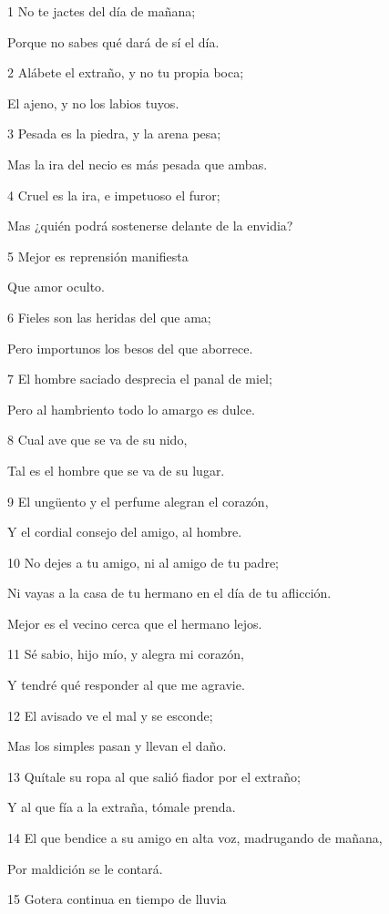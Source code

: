 \par 1 No te jactes del día de mañana;
\par Porque no sabes qué dará de sí el día. 
\par 2 Alábete el extraño, y no tu propia boca;
\par El ajeno, y no los labios tuyos.
\par 3 Pesada es la piedra, y la arena pesa;
\par Mas la ira del necio es más pesada que ambas.
\par 4 Cruel es la ira, e impetuoso el furor;
\par Mas ¿quién podrá sostenerse delante de la envidia?
\par 5 Mejor es reprensión manifiesta
\par Que amor oculto.
\par 6 Fieles son las heridas del que ama;
\par Pero importunos los besos del que aborrece.
\par 7 El hombre saciado desprecia el panal de miel;
\par Pero al hambriento todo lo amargo es dulce.
\par 8 Cual ave que se va de su nido,
\par Tal es el hombre que se va de su lugar.
\par 9 El ungüento y el perfume alegran el corazón,
\par Y el cordial consejo del amigo, al hombre.
\par 10 No dejes a tu amigo, ni al amigo de tu padre;
\par Ni vayas a la casa de tu hermano en el día de tu aflicción.
\par Mejor es el vecino cerca que el hermano lejos.
\par 11 Sé sabio, hijo mío, y alegra mi corazón,
\par Y tendré qué responder al que me agravie.
\par 12 El avisado ve el mal y se esconde;
\par Mas los simples pasan y llevan el daño.
\par 13 Quítale su ropa al que salió fiador por el extraño;
\par Y al que fía a la extraña, tómale prenda.
\par 14 El que bendice a su amigo en alta voz, madrugando de mañana,
\par Por maldición se le contará.
\par 15 Gotera continua en tiempo de lluvia
